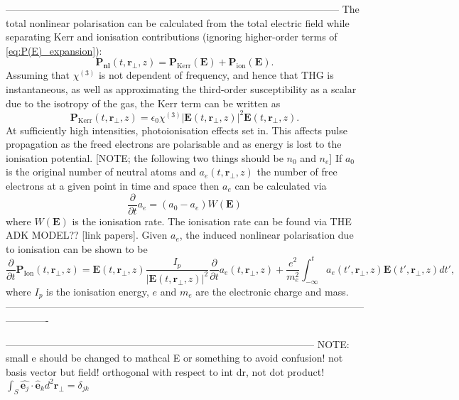 \documentclass[a4paper]{jpconf}
\begin{document}
-----------------------------------------------------------------------------------------------------
The total nonlinear polarisation can be calculated from the total electric field while separating Kerr and ionisation contributions (ignoring higher-order terms of \eqref{eq:P(E)_expansion}):
\begin{equation}
\mathbf{P}_\textbf{nl} (t, \mathbf{r}_\perp, z) = \mathbf{P}_\text{Kerr}(\mathbf{E}) + \mathbf{P}_\text{ion} (\mathbf{E}).
\end{equation}
Assuming that $\chi^{(3)}$ is not dependent of frequency, and hence that THG is instantaneous, as well as approximating the third-order susceptibility as a scalar due to the isotropy of the gas, the Kerr term can be written as 
\begin{equation}
\mathbf{P}_\text{Kerr}(t, \mathbf{r}_\perp, z) = \epsilon_0 \chi^{(3)} |\mathbf{E}(t, \mathbf{r}_\perp, z)|^2\mathbf{E}(t, \mathbf{r}_\perp, z).
\end{equation}
At sufficiently high intensities, photoionisation effects set in. This affects pulse propagation as the freed electrons are polarisable and as energy is lost to the ionisation potential. [NOTE; the following two things should be $n_0$ and $n_e$] If $a_0$ is the original number of neutral atoms and $a_e(t, \mathbf{r}_\perp, z)$ the number of free electrons at a given point in time and space then $a_e$ can be calculated via
\begin{equation}
\frac{\partial}{\partial t} a_e = (a_0 - a_e) W(\mathbf{E})
\end{equation}
where $W(\mathbf{E})$ is the ionisation rate. The ionisation rate can be found via THE ADK MODEL?? [link papers]. Given $a_e$, the induced nonlinear polarisation due to ionisation can be shown to be 
\begin{equation}
\frac{\partial}{\partial t} \mathbf{P}_\text{Ion}(t, \mathbf{r}_\perp, z) = \mathbf{E}(t, \mathbf{r}_\perp, z) \frac{I_p}{|\mathbf{E}(t, \mathbf{r}_\perp, z)|^2} \frac{\partial}{\partial t} a_e (t, \mathbf{r}_\perp, z ) + \frac{e^2}{m_e^2} \int_{-\infty}^t a_e (t', \mathbf{r}_\perp, z) \mathbf{E}(t', \mathbf{r}_\perp, z) dt',
\end{equation}
where $I_p$ is the ionisation energy, $e$ and $m_e$ are the electronic charge and mass.  
-------------------------------------------------------------------------------------------------------------------------


---------------------------------------------------------------------------------------------
NOTE: small e should be changed to mathcal E or something to avoid confusion! not basis vector but field! orthogonal with respect to int dr, not dot product!
$\int_S \hat{\mathbf{e}_j} \cdot \hat{\mathbf{e}}_k d^2 \mathbf{r}_\perp = \delta_{jk}$
\end{document}
